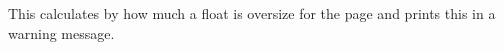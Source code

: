 %
\def\end@dblfloat{%
\if@twocolumn
  \@endfloatbox
  \ifnum\@floatpenalty <\z@
    \@largefloatcheck
    \@cons\@dbldeferlist\@currbox
  \fi
    \ifnum \@floatpenalty =-\@Mii \@Esphack\fi
\else
  \end@float
\fi
}
% 
\def \@endfloatbox{%
      \par\vskip\z@skip      %
%   
      \@minipagefalse   
      \outer@nobreak
    \egroup                  %
  \color@endbox
}
% 
 \begin{macro}{\outer@nobreak}
    \begin{teX}
\let\outer@nobreak\@empty
    \end{teX}
  \end{macro}
 

  \begin{macro}{\@largefloatcheck}
 
    This calculates by how much a float is oversize for the page and
    prints this in a warning message.
    
    \begin{teX}  
\def \@largefloatcheck{%
  \ifdim \ht\@currbox>\textheight
    \@tempdima -\textheight
    \advance \@tempdima \ht\@currbox
    \end{teX}

    \begin{teX}
    \@latex@warning {Float too large for page by \the\@tempdima}%
    \ht\@currbox \textheight
  \fi
}
    \end{teX}
  \end{macro}

